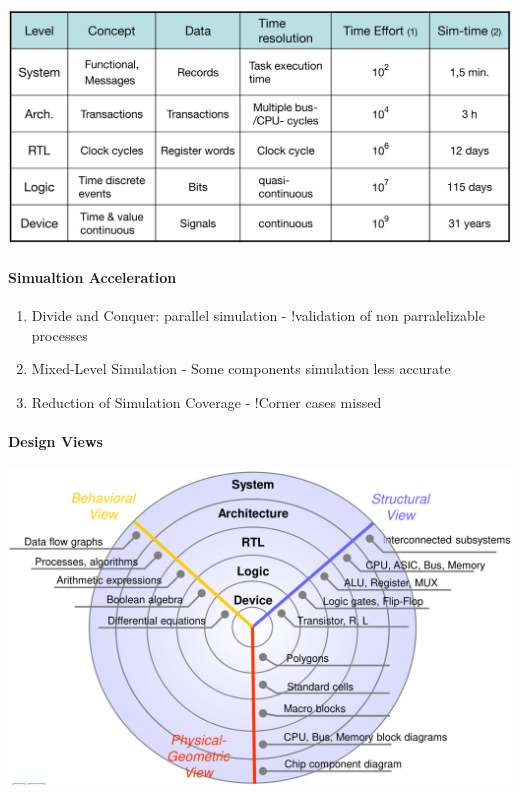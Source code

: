\documentclass[english]{latex4ei/latex4ei_sheet}
\begin{document}
\begin{center}
  \includegraphics[width=0.8\linewidth]{assets/SimulationAccuracyTime.png}
\end{center}
 
\paragraph{Simualtion Acceleration}
\begin{enumerate}
	\item Divide and Conquer: parallel simulation - !validation of non parralelizable processes
	\item Mixed-Level Simulation - Some components simulation less accurate
	\item Reduction of Simulation Coverage - !Corner cases missed
\end{enumerate}
 
\paragraph{Design Views}

\begin{center}
  \includegraphics[width=0.8\linewidth]{assets/DesignViews.png}
\end{center}
\end{document}
